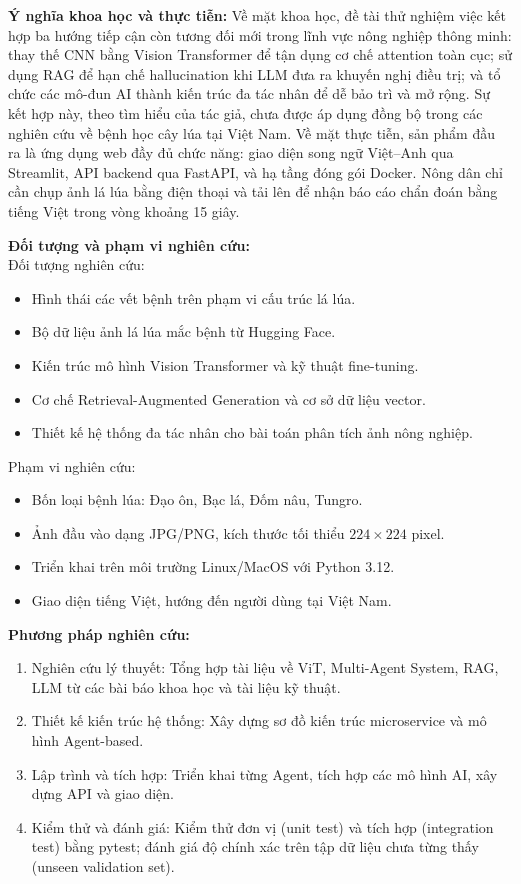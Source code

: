 \documentclass{uetgraduation}
\begin{document}
\textbf{Ý nghĩa khoa học và thực tiễn:} Về mặt khoa học, đề tài thử nghiệm việc kết hợp ba hướng tiếp cận còn tương đối mới trong lĩnh vực nông nghiệp thông minh: thay thế CNN bằng Vision Transformer để tận dụng cơ chế attention toàn cục; sử dụng RAG để hạn chế hallucination khi LLM đưa ra khuyến nghị điều trị; và tổ chức các mô-đun AI thành kiến trúc đa tác nhân để dễ bảo trì và mở rộng. Sự kết hợp này, theo tìm hiểu của tác giả, chưa được áp dụng đồng bộ trong các nghiên cứu về bệnh học cây lúa tại Việt Nam. Về mặt thực tiễn, sản phẩm đầu ra là ứng dụng web đầy đủ chức năng: giao diện song ngữ Việt--Anh qua Streamlit, API backend qua FastAPI, và hạ tầng đóng gói Docker. Nông dân chỉ cần chụp ảnh lá lúa bằng điện thoại và tải lên để nhận báo cáo chẩn đoán bằng tiếng Việt trong vòng khoảng 15 giây.

\textbf{Đối tượng và phạm vi nghiên cứu:}
\\ \indent Đối tượng nghiên cứu:
\begin{itemize}[leftmargin=1.5cm]
    \item Hình thái các vết bệnh trên phạm vi cấu trúc lá lúa.
    \item Bộ dữ liệu ảnh lá lúa mắc bệnh từ Hugging Face.
    \item Kiến trúc mô hình Vision Transformer và kỹ thuật fine-tuning.
    \item Cơ chế Retrieval-Augmented Generation và cơ sở dữ liệu vector.
    \item Thiết kế hệ thống đa tác nhân cho bài toán phân tích ảnh nông nghiệp.
\end{itemize}

Phạm vi nghiên cứu:
\begin{itemize}[leftmargin=1.5cm]
    \item Bốn loại bệnh lúa: Đạo ôn, Bạc lá, Đốm nâu, Tungro.
    \item Ảnh đầu vào dạng JPG/PNG, kích thước tối thiểu $224 \times 224$ pixel.
    \item Triển khai trên môi trường Linux/MacOS với Python 3.12.
    \item Giao diện tiếng Việt, hướng đến người dùng tại Việt Nam.
\end{itemize}

\textbf{Phương pháp nghiên cứu:}
\begin{enumerate}[leftmargin=1.5cm]
    \item Nghiên cứu lý thuyết: Tổng hợp tài liệu về ViT, Multi-Agent System, RAG, LLM từ các bài báo khoa học và tài liệu kỹ thuật.
    \item Thiết kế kiến trúc hệ thống: Xây dựng sơ đồ kiến trúc microservice và mô hình Agent-based.
    \item Lập trình và tích hợp: Triển khai từng Agent, tích hợp các mô hình AI, xây dựng API và giao diện.
    \item Kiểm thử và đánh giá: Kiểm thử đơn vị (unit test) và tích hợp (integration test) bằng pytest; đánh giá độ chính xác trên tập dữ liệu chưa từng thấy (unseen validation set).
\end{enumerate}
\end{document}
